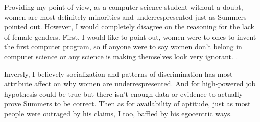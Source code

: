\par
Providing my point of view, as a computer science student without
a doubt, women are most definitely minorities and underrespresented
just as Summers pointed out. However, I would completely disagree on
the reasoning for the lack of female genders. First, I would like to
point out, women were to ones to invent the first computer program, 
so if anyone were to say women don't belong in computer science or any 
science is making themselves look very ignorant.
.

\par
Inversly, I believely socialization and patterns of discrimination
has most attribute affect on why women are underrespresented. And
for high-powered job hypothesis could be true but there isn't enough
data or evidence to actually prove Summers to be correct. Then as for
availability of aptitude, just as most people were outraged by his 
claims, I too, baffled by his egocentric ways.